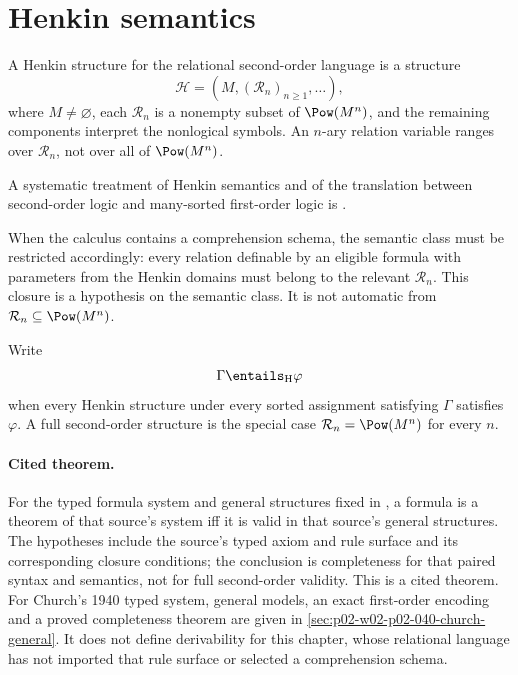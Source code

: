 \section{Henkin semantics}
\label{sec:second-order-logic-05}

\begin{definition}
A Henkin structure for the relational second-order language is a structure
\[
  \mathcal H=(M,(\mathcal R_n)_{n\geq1},\ldots),
\]
where \(M\ne\varnothing\), each
\(\mathcal R_n\) is a nonempty subset of \(\Pow(M^n)\), and the remaining
components interpret the nonlogical symbols.  An \(n\)-ary relation variable
ranges over \(\mathcal R_n\), not over all of \(\Pow(M^n)\).
\end{definition}

A systematic treatment of Henkin semantics and of the translation between
second-order logic and many-sorted first-order logic is
\cite{Manzano1996}.

When the calculus contains a comprehension schema, the semantic class
must be restricted accordingly: every relation definable by an eligible
formula with parameters from the Henkin domains must belong to the relevant
\(\mathcal R_n\).  This closure is a hypothesis on the semantic class.  It is
not automatic from \(\mathcal R_n\subseteq\Pow(M^n)\).

\begin{definition}
Write
\[
  \Gamma\entails_{\mathrm H}\varphi
\]
when every Henkin structure under every sorted assignment satisfying
\(\Gamma\) satisfies \(\varphi\).  A full second-order structure is the
special case
\(\mathcal R_n=\Pow(M^n)\) for every \(n\).
\end{definition}

\paragraph{Cited theorem.}
For the typed formula system and general structures fixed in
\cite[pp.~81--91]{Henkin1950}, a formula is a theorem of that source's system
iff it is valid in that source's general structures.  The hypotheses
include the source's typed axiom and rule surface and its corresponding closure
conditions; the conclusion is completeness for that paired syntax and
semantics, not for full second-order validity.  This is a cited theorem.
For Church's 1940 typed system, general models, an exact first-order
encoding and a proved completeness theorem are given in
\cref{sec:p02-w02-p02-040-church-general}.  It
does not define derivability for this chapter, whose relational language has
not imported that rule surface or selected a comprehension schema.


